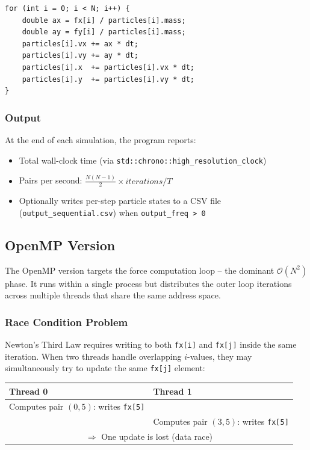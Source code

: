 ﻿\documentclass[12pt,a4paper]{article}
\begin{document}
\begin{lstlisting}
for (int i = 0; i < N; i++) {
    double ax = fx[i] / particles[i].mass;
    double ay = fy[i] / particles[i].mass;
    particles[i].vx += ax * dt;
    particles[i].vy += ay * dt;
    particles[i].x  += particles[i].vx * dt;
    particles[i].y  += particles[i].vy * dt;
}
\end{lstlisting}

\subsubsection*{Output}

At the end of each simulation, the program reports:
\begin{itemize}
    \item Total wall-clock time (via \texttt{std::chrono::high\_resolution\_clock})
    \item Pairs per second: $\frac{N(N-1)}{2} \times \textit{iterations} / T$
    \item Optionally writes per-step particle states to a CSV file
          (\texttt{output\_sequential.csv}) when \texttt{output\_freq > 0}
\end{itemize}

\subsection{OpenMP Version}

The OpenMP version targets the force computation loop -- the dominant
$\mathcal{O}(N^2)$ phase. It runs within a single process but distributes
the outer loop iterations across multiple threads that share the same
address space.

\subsubsection*{Race Condition Problem}

Newton's Third Law requires writing to both \texttt{fx[i]} and \texttt{fx[j]}
inside the same iteration. When two threads handle overlapping $i$-values, they
may simultaneously try to update the same \texttt{fx[j]} element:

\begin{center}
\begin{tabular}{ll}
    \toprule
    \textbf{Thread 0} & \textbf{Thread 1} \\
    \midrule
    Computes pair $(0, 5)$: writes \texttt{fx[5]} & \\
    & Computes pair $(3, 5)$: writes \texttt{fx[5]} \\
    \multicolumn{2}{c}{$\Rightarrow$ One update is lost (data race)} \\
    \bottomrule
\end{tabular}
\end{center}
\end{document}
